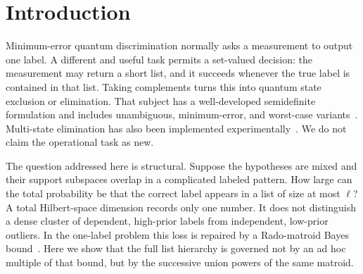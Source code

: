 \documentclass[11pt]{article}
\theoremstyle{definition}
\theoremstyle{remark}
\newcommand{\Tr}{\operatorname{Tr}}
\begin{document}
\begin{abstract}
The process extension becomes exact for a complete input-dependent family
whose channels dephase before preparing a classical output.  For $M=2^h$
equiprobable hypotheses, list size $\ell=2^s$, and $q$ uses, we prove against
arbitrary entangled parallel inputs and adaptive quantum memories that
\[
 P_{\rm par}^{(\ell)}(q)=\min\{1,\ell(q+1)/M\},\qquad
 P_{\rm ad}^{(\ell)}(q)=\min\{1,\ell2^q/M\}.
\]
Thus perfect list identification needs exactly $M/\ell-1$ parallel calls but
only $\log_2(M/\ell)$ adaptive calls.  The fixed parallel transcripts induce
partition matroids whose union caps are attained cell by cell.  This is an
exact list/feedback tradeoff in classical channels embedded quantumly, not a
claim of quantum or indefinite-causal-order advantage.

For a complete unitary-error ensemble and fixed pure probe, we translate the
known optimal approximate dense-coding law into the present process-list
language,
$P_{\rm guess}=(\Tr\sqrt{\rho_R})^2/D$.  It yields the sharp
Schmidt-rank cap $r/D$ and, for independent Weyl histories, exact list optima
for carrier-only serial, unreferenced parallel, and Bell-assisted wirings.
These channel theorems turn process compression into resource-resolved exact
statements while retaining explicit boundaries on prior art and scope.
\end{abstract}

\section{Introduction}

Minimum-error quantum discrimination normally asks a measurement to output
one label.  A different and useful task permits a set-valued decision: the
measurement may return a short list, and it succeeds whenever the true label
is contained in that list.  Taking complements turns this into quantum state
exclusion or elimination.  That subject has a well-developed semidefinite
formulation and includes unambiguous, minimum-error, and worst-case
variants~\cite{bandyopadhyay2014}.  Multi-state elimination has also been
implemented experimentally~\cite{webb2023}.  We do not claim the operational
task as new.

The question addressed here is structural.  Suppose the hypotheses are mixed
and their support subspaces overlap in a complicated labeled pattern.  How
large can the total probability be that the correct label appears in a list
of size at most $\ell$?  A total Hilbert-space dimension records only one
number.  It does not distinguish a dense cluster of dependent, high-prior
labels from independent, low-prior outliers.  In the one-label problem this
loss is repaired by a Rado-matroid Bayes bound~\cite{eriksson2026matroid}.
Here we show that the full list hierarchy is governed not by an ad hoc
multiple of that bound, but by the successive union powers of the same
matroid.
\end{document}
